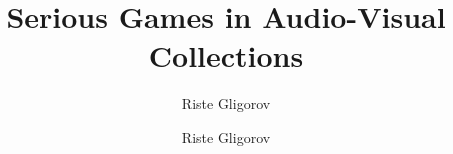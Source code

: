 \documentclass[a4paper,12pt]{book}
\author{Riste Gligorov}
\begin{document}
\title{Serious Games in Audio-Visual Collections}

\author{Riste Gligorov}

\maketitle

\tableofcontents

\newcommand\T{\rule{0pt}{3ex}}
\newcommand\B{\rule[-1.6ex]{0pt}{0pt}}

\newtheorem{thesisdef}{Definition}

\newcommand{\noop}[1]{} %







%

%







\begin{appendices}




\end{appendices}



\end{document}
